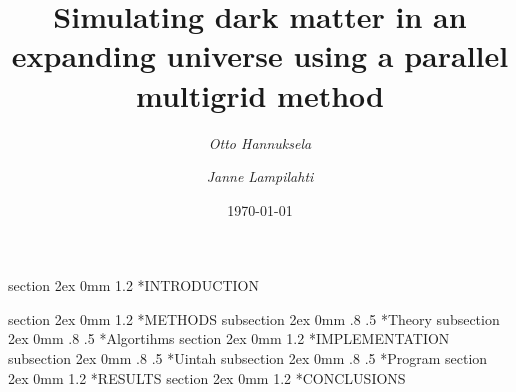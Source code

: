 \documentclass[notitlepage, 11pt]{article}
\title{Simulating dark matter in an expanding universe using a parallel multigrid method}
\author{{\em Otto Hannuksela} \and {\em Janne Lampilahti}}
\date{\today}
\makeatletter
\renewcommand{\section}{\@startsection       %
        {section}
        {2ex}
        {0mm}
        {1.2\baselineskip}
        {\baselineskip}
        {\centering\normalsize}}
\renewcommand{\subsection}{\@startsection    %
        {subsection}
        {2ex}
        {0mm}
        {.8\baselineskip}
        {.5\baselineskip}
        {\bfseries\normalsize}}
\makeatother
\begin{document}
\maketitle
\section*{INTRODUCTION}

\section*{METHODS}
\subsection*{Theory}
\subsection*{Algortihms}
\section*{IMPLEMENTATION}
\subsection*{Uintah}
\subsection*{Program}
\section*{RESULTS}
\section*{CONCLUSIONS}

%
\end{document}
